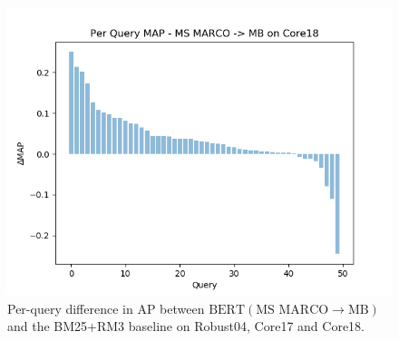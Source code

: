 \begin{figure}[b!]
\begin{minipage}{0.33\textwidth}
        \includegraphics[width=\textwidth]{figures/perquery3.png}
    \end{minipage}
\caption{Per-query difference in AP between $ \textrm{BERT}(\textrm{MS MARCO}\rightarrow\textrm{MB}) $ and the BM25+RM3 baseline on Robust04, Core17 and Core18.}
\label{fig:perquery-msmarcomb}
\end{figure}

